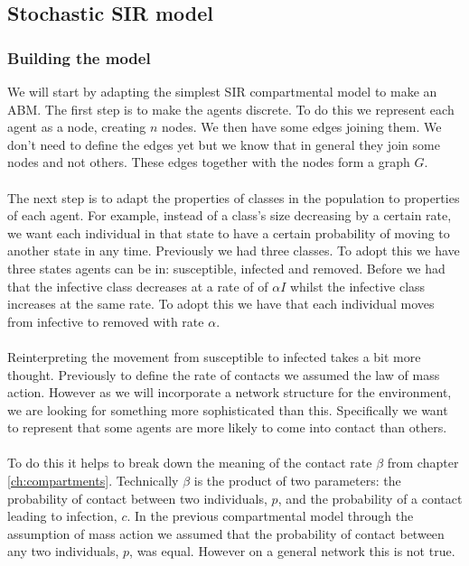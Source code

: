 \subsection{Stochastic SIR model}
\subsubsection{Building the model}
We will start by adapting the simplest SIR compartmental model to make an ABM. The first step is to make the agents discrete. To do this we represent each agent as a node, creating $n$ nodes. We then have some edges joining them. We don't need to define the edges yet but we know that in general they join some nodes and not others. These edges together with the nodes form a graph $G$.\\
\\
The next step is to adapt the properties of classes in the population to properties of each agent. For example, instead of a class's size decreasing by a certain rate, we want each individual in that state to have a certain probability of moving to another state in any time. Previously we had three classes. To adopt this we have three states agents can be in: susceptible, infected and removed. Before we had that the infective class decreases at a rate of of $\alpha I$ whilst the infective class increases at the same rate. To adopt this we have that each individual moves from infective to removed with rate $\alpha$.\\
\\
Reinterpreting the movement from susceptible to infected takes a bit more thought. Previously to define the rate of contacts we assumed the law of mass action. However as we will incorporate a network structure for the environment, we are looking for something more sophisticated than this. Specifically we want to represent that some agents are more likely to come into contact than others.\\
\\
To do this it helps to break down the meaning of the contact rate $\beta$ from chapter \ref{ch:compartments}. Technically $\beta$ is the product of two parameters: the probability of contact between two individuals, $p$, and the probability of a contact leading to infection, $c$. In the previous compartmental model through the assumption of mass action we assumed that the probability of contact between any two individuals, $p$, was equal. However on a general network this is not true.\\
